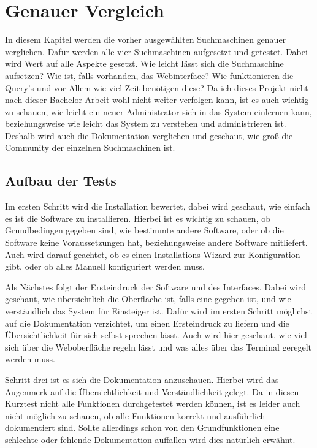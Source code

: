 \chapter{Genauer Vergleich}

In diesem Kapitel werden die vorher ausgewählten Suchmaschinen genauer verglichen. Dafür werden alle vier Suchmaschinen aufgesetzt und getestet. Dabei wird Wert auf alle Aspekte gesetzt. Wie leicht lässt sich die Suchmaschine aufsetzen? Wie ist, falls vorhanden, das Webinterface? Wie funktionieren die Query’s und vor Allem wie viel Zeit benötigen diese? Da ich dieses Projekt nicht nach dieser Bachelor-Arbeit wohl nicht weiter verfolgen kann, ist es auch wichtig zu schauen, wie leicht ein neuer Administrator sich in das System einlernen kann, beziehungsweise wie leicht das System zu verstehen und administrieren ist. Deshalb wird auch die Dokumentation verglichen und geschaut, wie groß die Community der einzelnen Suchmaschinen ist. 

\section{Aufbau der Tests}

Im ersten Schritt wird die Installation bewertet, dabei wird geschaut, wie einfach es ist die Software zu installieren. Hierbei ist es wichtig zu schauen, ob Grundbedingen gegeben sind, wie bestimmte andere Software, oder ob die Software keine Voraussetzungen hat, beziehungsweise andere Software mitliefert. Auch wird darauf geachtet, ob es einen Installations-Wizard zur Konfiguration gibt, oder ob alles Manuell konfiguriert werden muss.

Als Nächstes folgt der Ersteindruck der Software und des Interfaces. Dabei wird geschaut, wie übersichtlich die Oberfläche ist, falls eine gegeben ist, und wie verständlich das System für Einsteiger ist. Dafür wird im ersten Schritt möglichst auf die Dokumentation verzichtet, um einen Ersteindruck zu liefern und die Übersichtlichkeit für sich selbst sprechen lässt. Auch wird hier geschaut, wie viel sich über die Weboberfläche regeln lässt und was alles über das Terminal geregelt werden muss.

Schritt drei ist es sich die Dokumentation anzuschauen. Hierbei wird das Augenmerk auf die Übersichtlichkeit und Verständlichkeit gelegt. Da in diesen Kurztest nicht alle Funktionen durchgetestet werden können, ist es leider auch nicht möglich zu schauen, ob alle Funktionen korrekt und ausführlich dokumentiert sind. Sollte allerdings schon von den Grundfunktionen eine schlechte oder fehlende Dokumentation auffallen wird dies natürlich erwähnt. 

